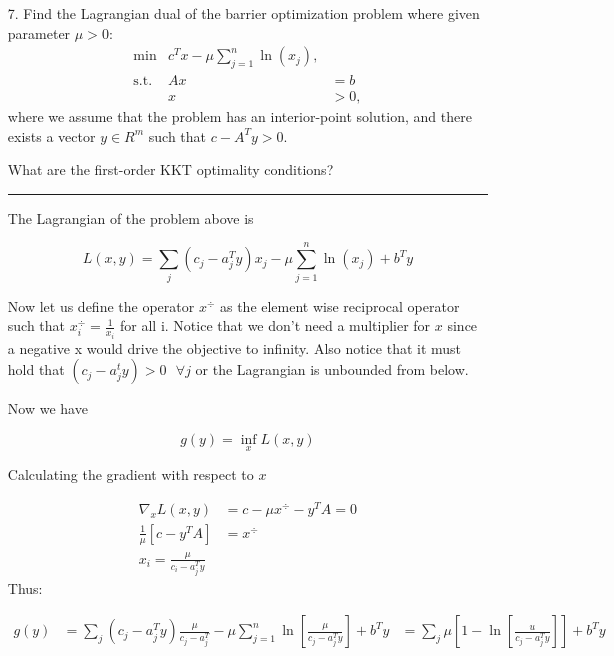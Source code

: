 \documentclass{article} %
\begin{document}
\begin{enumerate}
\begin{itemize}


\rule{\textwidth}{1pt}

\end{itemize}

\item[7.] Find the Lagrangian dual of the barrier optimization problem where given parameter $\mu>0$:
\[\begin{array}{rcl}
\min          & c^Tx-\mu\sum_{j=1}^n\ln(x_j),\\
\mbox{s.t.}& Ax  &= b\\
                &  x    & > 0,
\end{array}
\]
where we assume that the problem has an interior-point solution, and there exists a vector $y\in R^m$ such that $c-A^Ty>0$.

What are the first-order KKT optimality conditions?


\rule{\textwidth}{1pt}
The Lagrangian of the problem above is

\[
L(x,y) = \sum_j (c_j - a_j^T y) x_j - \mu \sum_{j=1}^{n} \ln(x_j) + b^T y
\]

Now let us define the operator $x^{\div}$ as the element wise reciprocal operator such that $x_i^{\div} = \frac{1}{x_i}$ for all i. Notice that we don't need a multiplier for $x$ since a negative x would drive the objective to infinity. Also notice that it must hold that $(c_j - a_j^t y) > 0 \mbox{  } \forall j$ or the Lagrangian is unbounded from below.



 Now we have 

 \[
g(y) = \inf_{x} L(x,y)
 \]

 Calculating the gradient with respect to $x$ 


\begin{equation*}
\begin{aligned}
\nabla_x L(x,y) &= c - \mu x^{\div} - y^T A = 0 \\ 
\frac{1}{\mu} [ c - y^T A] &= x^{\div} \\ 
x_i = \frac{\mu}{c_i - a_j^T y}
\end{aligned}
\end{equation*}
Thus:

\begin{equation*}
\begin{aligned}
g(y) &= \sum_j (c_j - a_j^T y) \frac{\mu}{c_j - a_j^T} - \mu \sum_{j=1}^{n} \ln[\frac{\mu}{c_j - a_j^T y}] + b^T y
&= \sum_{j} \mu[ 1 - \ln[\frac{u}{c_j - a_j^T y}]]  + b^T y
\end{aligned}
\end{equation*}


\end{enumerate}
\end{document}
